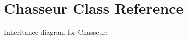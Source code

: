 \hypertarget{classChasseur}{}\section{Chasseur Class Reference}
\label{classChasseur}


Inheritance diagram for Chasseur\+:
